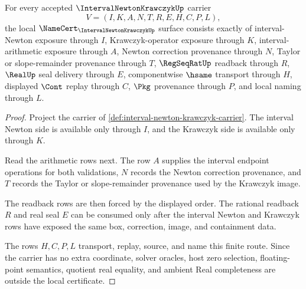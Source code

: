 \begin{theorem}
\label{thm:interval-newton-krawczyk-namecert-obligations}
For every accepted $\IntervalNewtonKrawczykUp$ carrier
$$
V=(I,K,A,N,T,R,E,H,C,P,L),
$$
the local $\NameCert_{\IntervalNewtonKrawczykUp}$ surface consists exactly of interval-Newton exposure through $I$, Krawczyk-operator exposure through $K$, interval-arithmetic exposure through $A$, Newton correction provenance through $N$, Taylor or slope-remainder provenance through $T$, $\RegSeqRatUp$ readback through $R$, $\RealUp$ seal delivery through $E$, componentwise $\hsame$ transport through $H$, displayed $\Cont$ replay through $C$, $\Pkg$ provenance through $P$, and local naming through $L$.
\end{theorem}
\begin{proof}
Project the carrier of \autoref{def:interval-newton-krawczyk-carrier}. The interval Newton side is available only through $I$, and the Krawczyk side is available only through $K$.

Read the arithmetic rows next. The row $A$ supplies the interval endpoint operations for both validations, $N$ records the Newton correction provenance, and $T$ records the Taylor or slope-remainder provenance used by the Krawczyk image.

The readback rows are then forced by the displayed order. The rational readback $R$ and real seal $E$ can be consumed only after the interval Newton and Krawczyk rows have exposed the same box, correction, image, and containment data.

The rows $H,C,P,L$ transport, replay, source, and name this finite route. Since the carrier has no extra coordinate, solver oracles, host zero selection, floating-point semantics, quotient real equality, and ambient Real completeness are outside the local certificate.
\end{proof}

